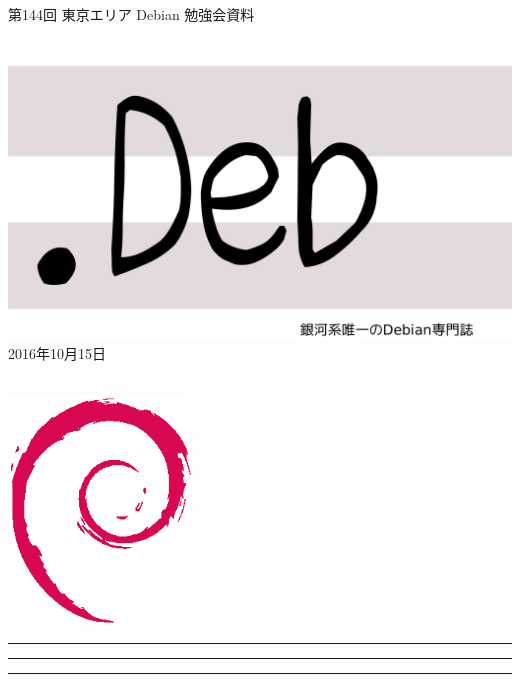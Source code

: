\documentclass[mingoth,a4paper]{jsarticle}
\newcommand{\debmtgyear}{2016}
\newcommand{\debmtgmonth}{10}
\newcommand{\debmtgdate}{15}
\newcommand{\debmtgnumber}{144}
\begin{document}
\begin{titlepage}
\thispagestyle{empty}

\vspace*{-2cm}
第\debmtgnumber{}回 東京エリア Debian 勉強会資料\\
\hspace*{-2cm}
\includegraphics{image2012-natsu/dotdeb.pdf}\\
\hfill{}\debmtgyear{}年\debmtgmonth{}月\debmtgdate{}日

\\

\vspace*{-2cm}
\hfill{}\includegraphics[height=6cm]{image200502/openlogo-nd.eps}
\end{titlepage}

\newpage

\begin{minipage}[b]{0.2\hsize}
 \colorbox{titleback}{}
\end{minipage}
\begin{minipage}[b]{0.8\hsize}
\hrule
\vspace{2mm}
\hrule
\begin{multicols}{2}
\tableofcontents
\end{multicols}
\vspace{2mm}
\hrule
\end{minipage}
\end{document}
